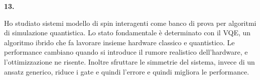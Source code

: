 \documentclass[12pt,a4paper]{article}
\newcommand{\slidenum}[1]{%
  \par\vspace{0.55cm}
  {\bfseries\large #1.}\quad
}
\begin{document}
\slidenum{13}
Ho studiato sistemi modello di spin interagenti come banco di prova per algoritmi di simulazione quantistica. Lo stato fondamentale è determinato con il VQE, un algoritmo ibrido che fa lavorare insieme hardware classico e quantistico. Le performance cambiano quando si introduce il rumore realistico dell'hardware, e l'ottimizzazione ne risente. Inoltre sfruttare le simmetrie del sistema, invece di un ansatz generico, riduce i gate e quindi l'errore e quindi migliora le performance.
\end{document}
